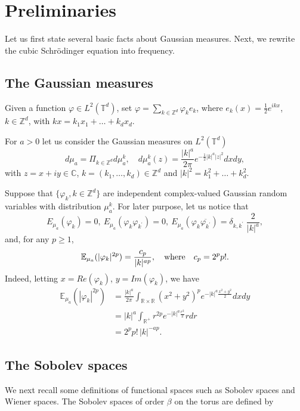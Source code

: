 \documentclass[11pt,leqno]{amsart}
\newcommand{\R}{\mathbb{R}}
\newcommand{\Z}{\mathbb{Z}}
\begin{document}
\section{Preliminaries}	\label{preliminaries} 
Let us first  state several basic facts about Gaussian measures. 
Next, we rewrite the cubic Schr\" odinger equation into frequency. 

\subsection{The Gaussian measures}
 Given a function $\varphi \in L^2({\mathbb T}^d)$, set $\varphi = \sum_{k\in \Z^d} \varphi_k e_k$, where 
  $e_k (x)= \frac{1}{2} e^{ikx}$, $k\in \Z^d$, with $kx=k_1 x_1+\ldots  +k_d x_d$. 


For $a>0$ let us consider  the Gaussian measures on $L^2({\mathbb T}^d)$
$$d\mu_a = \Pi_{k\in \Z^d} d \mu_a^k ,\quad 
d\mu_a^k (z)= \frac{|k|^{a}}{2\pi}e^{-\frac{1}{2} |k|^a |z|^2} dx dy,$$
with $z=x+iy \in \mathbb{C}$,  $k= (k_1,\ldots , k_d) \in \Z^d$ and $|k|^2 = k_1^2+\ldots + k_d^2$.




Suppose that $\{ \varphi_k , k\in \Z^d\}$ are independent  complex-valued 
Gaussian random variables with distribution $\mu_a^k$. 
For later purpose, let us notice that
$$E_{\mu_a}(\varphi_k)=0,\ E_{\mu_a} (\varphi_k \varphi_{k^\prime})=0,\ E_{\mu_a} (\varphi_k \overline{\varphi_{k^\prime}})=\delta_{k,k^\prime}  \; \frac{2}{|k|^{a}},$$
and, for any $p\geq 1$,
\begin{equation}
\label{formvar}
\mathbb{E}_{\mu_a} (|\varphi_k|^{2p})=\dfrac{c_p}{|k|^{ap}}, \quad \mbox{\rm where} \quad 
c_p= 2^p p!.
\end{equation} 
Indeed, letting $x=Re (\varphi_k)$, $y= Im (\varphi_k)$, 
we have
\begin{align*}
\mathbb{E}_{\mu_a} (|\varphi_k|^{2p}) &=
\frac{ |k|^a}{2\pi}  \int_{\R \times \R}(x^2 +y^2 )^p e^{- |k|^a \frac{x^2 +y^2}{2}} dx dy\\
&=  |k|^{a} \int_{\R^+ } r^{2p} e^{- |k|^a \frac{r^2}{2}}r dr\\
&=  2^p p!  \,  |k|^{-ap}. 
\end{align*}




\subsection{The Sobolev spaces} We next  recall some definitions of  functional spaces such as Sobolev spaces and Wiener spaces. 
The Sobolev spaces of order $\beta$ on the torus are defined by
\end{document}
